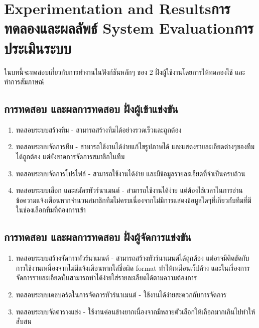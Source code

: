 \chapter{\ifproject%
\ifenglish Experimentation and Results\else การทดลองและผลลัพธ์\fi
\else%
\ifenglish System Evaluation\else การประเมินระบบ\fi
\fi}

ในบทนี้จะทดสอบเกี่ยวกับการทำงานในฟังก์ชันหลักๆ ของ 2 ฝั่งผู้ใช้งานโดยการให้ทดลองใช้ และทำการสัมภาษณ์

\section{การทดสอบ และผลการทดสอบ ฝั่งผู้เข้าแข่งขัน}
\begin{enumerate}
    \item ทดสอบระบบสร้างทีม - สามารถสร้างทีมได้อย่างรวดเร็วและถูกต้อง
    \item ทดสอบระบบจัดการทีม - สามารถใช้งานได้ง่ายแก้ไขรูปภาพได้ และแสดงรายละเอียดต่างๆของทีมได้ถูกต้อง แต่ยังขาดการจัดการสมาชิกในทีม
    \item ทดสอบระบบจัดการโปรไฟล์ - สามารถใช้งานได้ง่าย และมีข้อมูลรายละเอียดที่จำเป็นครบถ้วน
    \item ทดสอบระบบเลือก และสมัครทัวร์นาเมนต์ - สามารถใช้งานได้ง่าย แต่ต้องใช้เวลาในการอ่านข้อความแจ้งเตือนหากจำนวนสมาชิกทีมไม่ครบเนื่องจากไม่มีการแสดงข้อมูลใดๆที่เกี่ยวกับทีมที่มีในช่องเลือกทีมที่ต้องการเข้า
  \end{enumerate}


\section{การทดสอบ และผลการทดสอบ ฝั่งผู้จัดการแข่งขัน}
\begin{enumerate}
    \item ทดสอบระบบสร้างจัดการทัวร์นาเมนต์ - สามารถสร้างทัวร์นาเมนต์ได้ถูกต้อง แต่อาจมีติดขัดกับการใช้งานเหนื่องจากไม่มีแจ้งเตือนหากใส่ชื่อผิด format ทำให้เหมือนเว็ปค้าง และในเรื่องการจัดการรายละเอียดนั้นสามารถทำได้ง่ายใส่รายละเอียดได้ตามความต้องการ
    \item ทดสอบระบบเดชบอร์ดในการจัดการทัวร์นาเมนต์ - ใช้งานได้ง่ายสะดวกกับการจัดการ
    \item ทดสอบระบบจัดตารางแข่ง - ใช้งานค่อนข้างยากเนื่องจากมีหลายตัวเลือกให้เลือกมากเกินไปทำให้สับสน
  \end{enumerate}

